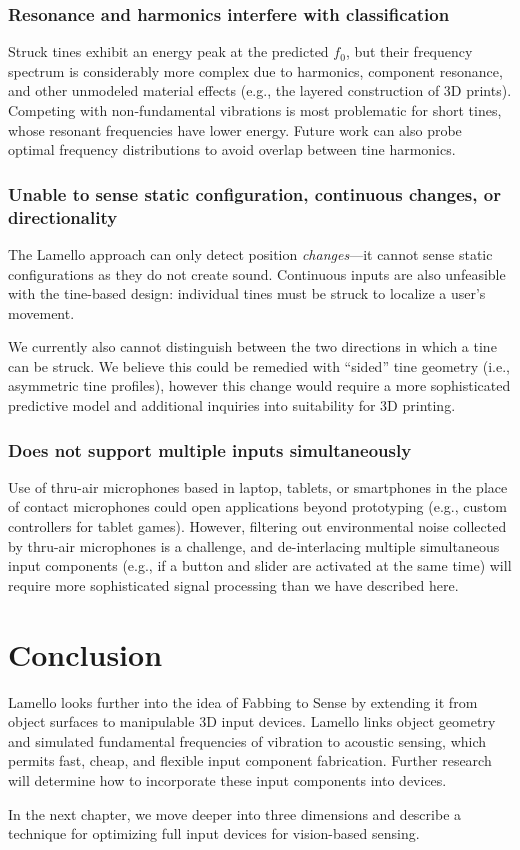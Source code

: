     \subsubsection{Resonance and harmonics interfere with classification}
    Struck tines exhibit an energy peak at the predicted $f_0$, but their frequency spectrum is considerably more complex due to harmonics, component resonance, and other unmodeled material effects (e.g., the layered construction of 3D prints). Competing with non-fundamental vibrations is most problematic for short tines, whose resonant frequencies have lower energy. Future work can also probe optimal frequency distributions to avoid overlap between tine harmonics.

    \subsubsection{Unable to sense static configuration, continuous changes, or directionality}

    The Lamello approach can only detect position \emph{changes}---it cannot sense static configurations as they do not create sound. Continuous inputs are also unfeasible with the tine-based design: individual tines must be struck to localize a user's movement.
    
    We currently also cannot distinguish between the two directions in which a tine can be struck. We believe this could be remedied with ``sided'' tine geometry (i.e., asymmetric tine profiles), however this change would require a more sophisticated predictive model and additional inquiries into suitability for 3D printing.
    
    \subsubsection{Does not support multiple inputs simultaneously}
    Use of thru-air microphones based in laptop, tablets, or smartphones in the place of contact microphones could open applications beyond prototyping (e.g., custom controllers for tablet games). However, filtering out environmental noise collected by thru-air microphones is a challenge, and de-interlacing multiple simultaneous input components (e.g., if a button and slider are activated at the same time) will require more sophisticated signal processing than we have described here.

\section{Conclusion}

Lamello looks further into the idea of Fabbing to Sense by extending it from object surfaces to manipulable 3D input devices. Lamello links object geometry and simulated fundamental frequencies of vibration to acoustic sensing, which permits fast, cheap, and flexible input component fabrication. Further research will determine how to incorporate these input components into devices.

In the next chapter, we move deeper into three dimensions and describe a technique for optimizing full input devices for vision-based sensing.